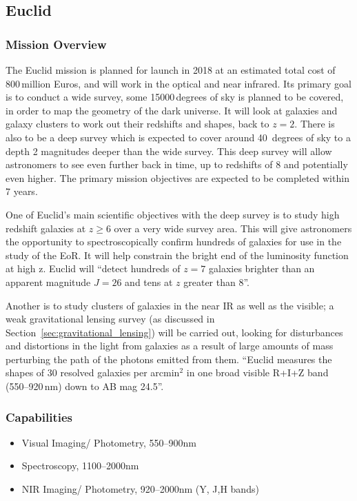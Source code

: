 
\subsection{Euclid} %
\label{sub:euclid}

	\subsubsection{Mission Overview} %
	\label{ssub:mission_overview}
		The Euclid mission is planned for launch in 2018\cite[p.~8]{Euclid_Definition_Study_Report} at an estimated total cost of 800\,million Euros, and will work in the optical and near infrared\cite{bbc_euclid}. Its primary goal is to conduct a wide survey, some 15000\,degrees of sky is planned to be covered, in order to map the geometry of the dark universe. It will look at galaxies and galaxy clusters to work out their redshifts and shapes, back to $z=2$. There is also to be a deep survey which is expected to cover around 40\, degrees of sky to a depth 2 magnitudes deeper than the wide survey. This deep survey will allow astronomers to see even further back in time, up to redshifts of 8 and potentially even higher. The primary mission objectives are expected to be completed within 7 years.

		One of Euclid's main scientific objectives with the deep survey is to study high redshift galaxies at $z\ge6$ over a very wide survey area. This will give astronomers the opportunity to spectroscopically confirm hundreds of galaxies for use in the study of the EoR. It will help constrain the bright end of the luminosity function at high z. Euclid will ``detect hundreds of $z=7$ galaxies brighter than an apparent magnitude $J=26$ and tens at $z$ greater than 8''\cite{Euclid_Definition_Study_Report}.

		Another is to study clusters of galaxies in the near IR as well as the visible; a weak gravitational lensing survey (as discussed in Section~\ref{sec:gravitational_lensing}) will be carried out, looking for disturbances and distortions in the light from galaxies as a result of large amounts of mass perturbing the path of the photons emitted from them. ``Euclid measures the shapes of 30 resolved galaxies per arcmin$^2$ in one broad visible R+I+Z band (550--920\,\si{\nano\metre}) down to AB mag 24.5''\cite[p.~9]{Euclid_Definition_Study_Report}.

	\subsubsection{Capabilities} %
	\label{ssub:euclid_capabilities}
		\begin{itemize}
			\item Visual Imaging/ Photometry, 550--900\si{\nano\metre}
			\item Spectroscopy, 1100--2000\si{\nano\metre}
			\item NIR Imaging/ Photometry, 920--2000\si{\nano\metre} (Y, J,H bands)
		\end{itemize}

